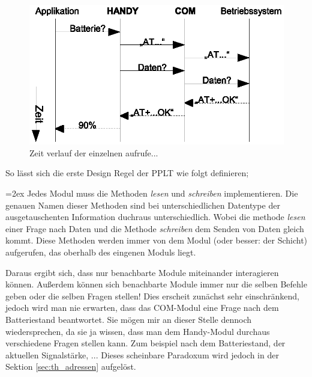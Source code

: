 \documentclass[a4paper,10pt]{book}
\newenvironment{merke}%
    {\begin{center}\bfseries\begin{Sbox}\begin{minipage}{10cm}\parskip=2ex}%
    {\end{minipage}\end{Sbox}\fbox{\TheSbox}\end{center}}
\begin{document}
    \begin{figure}
        \centering
        \includegraphics[scale=.8]{osi-handy-time.eps}
        \caption{Zeit verlauf der einzelnen aufrufe...}
        \label{fig:osi_handy_time}
    \end{figure}

    So lässt sich die erste Design Regel der PPLT wie folgt definieren;
    \begin{merke}
        Jedes Modul muss die Methoden \textit{lesen} und \textit{schreiben}
        implementieren. Die genauen Namen dieser Methoden sind bei 
        unterschiedlichen Datentype der ausgetauschenten Information duchraus
        unterschiedlich. Wobei die methode \textit{lesen} einer Frage nach
        Daten und die Methode \textit{schreiben} dem Senden von Daten 
        gleich kommt. Diese Methoden werden immer von dem Modul (oder
        besser: der Schicht) aufgerufen, das oberhalb des eingenen 
        Moduls liegt.
        
        Daraus ergibt sich, dass nur benachbarte Module miteinander 
        interagieren können. Außerdem können sich benachbarte Module immer nur
        die selben Befehle geben oder die selben Fragen stellen! Dies erscheit
        zunächst sehr einschränkend, jedoch wird man nie erwarten, dass das 
        COM-Modul eine Frage nach dem Batteriestand beantwortet.
        Sie mögen mir an dieser Stelle dennoch wiedersprechen, da sie ja 
        wissen, dass man dem Handy-Modul durchaus verschiedene Fragen stellen 
        kann. Zum beispiel nach dem Batteriestand, der aktuellen Signalstärke,
        ... Dieses scheinbare Paradoxum wird jedoch in der Sektion 
        \ref{sec:th_adressen} aufgelöst. 
    \end{merke}

    
    
\end{document}
